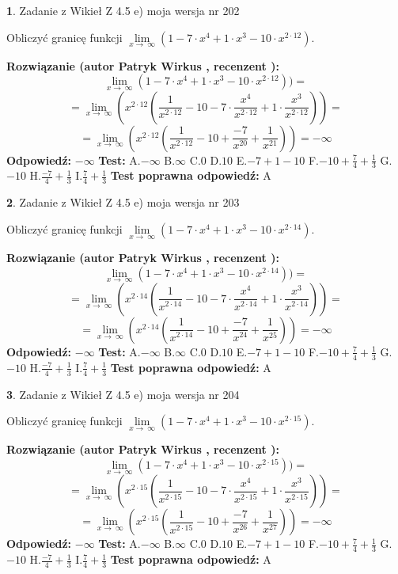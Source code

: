\documentclass[12pt, a4paper]{article}
\theoremstyle{definition} %
\newtheorem{zad}{}
\newcommand{\zadStart}[1]{\begin{zad}#1\newline}
\newcommand{\zadStop}{\end{zad}}
\newcommand{\rozwStart}[2]{\noindent \textbf{Rozwiązanie (autor #1 , recenzent #2): }\newline}
\newcommand{\rozwStop}{\newline}
\newcommand{\odpStart}{\noindent \textbf{Odpowiedź:}\newline}
\newcommand{\odpStop}{\newline}
\newcommand{\testStart}{\noindent \textbf{Test:}\newline}
\newcommand{\testStop}{\newline}
\newcommand{\kluczStart}{\noindent \textbf{Test poprawna odpowiedź:}\newline}
\newcommand{\kluczStop}{\newline}
\begin{document}
\zadStart{Zadanie z Wikieł Z 4.5 e) moja wersja nr 202}



Obliczyć granicę funkcji  $\lim\limits_{x\to\ \infty}(1 - 7 \cdot x^{4}+1 \cdot x^{3}- 10 \cdot x^{2\cdot12})$.
\zadStop
\rozwStart{Patryk Wirkus}{}
$$\lim\limits_{x\to\ \infty}(1 - 7 \cdot x^{4}+1 \cdot x^{3}- 10 \cdot x^{2\cdot12}))=$$
$$=\lim\limits_{x\to\ \infty}(x^{2\cdot12}(\frac{1}{x^{2\cdot12}}-10 -7 \cdot \frac{x^{4}}{x^{2\cdot12}}+1 \cdot \frac{x^{3}}{x^{2\cdot12}}))=$$
$$=\lim\limits_{x\to\ \infty}(x^{2\cdot12}(\frac{1}{x^{2\cdot12}}-10 + \frac{-7}{x^{20}}+ \frac{1}{x^{21}}))=-\infty$$
\rozwStop
\odpStart
$-\infty$
\odpStop
\testStart
A.$-\infty$ B.$\infty$ C.$0$ D.$10$ E.$-7 + 1 - 10$
F.$-10+\frac{7}{4}+\frac{1}{3}$ G.$-10$
H.$\frac{-7}{4}+\frac{1}{3}$
I.$\frac{7}{4}+\frac{1}{3}$
\testStop
\kluczStart
A
\kluczStop



\zadStart{Zadanie z Wikieł Z 4.5 e) moja wersja nr 203}



Obliczyć granicę funkcji  $\lim\limits_{x\to\ \infty}(1 - 7 \cdot x^{4}+1 \cdot x^{3}- 10 \cdot x^{2\cdot14})$.
\zadStop
\rozwStart{Patryk Wirkus}{}
$$\lim\limits_{x\to\ \infty}(1 - 7 \cdot x^{4}+1 \cdot x^{3}- 10 \cdot x^{2\cdot14}))=$$
$$=\lim\limits_{x\to\ \infty}(x^{2\cdot14}(\frac{1}{x^{2\cdot14}}-10 -7 \cdot \frac{x^{4}}{x^{2\cdot14}}+1 \cdot \frac{x^{3}}{x^{2\cdot14}}))=$$
$$=\lim\limits_{x\to\ \infty}(x^{2\cdot14}(\frac{1}{x^{2\cdot14}}-10 + \frac{-7}{x^{24}}+ \frac{1}{x^{25}}))=-\infty$$
\rozwStop
\odpStart
$-\infty$
\odpStop
\testStart
A.$-\infty$ B.$\infty$ C.$0$ D.$10$ E.$-7 + 1 - 10$
F.$-10+\frac{7}{4}+\frac{1}{3}$ G.$-10$
H.$\frac{-7}{4}+\frac{1}{3}$
I.$\frac{7}{4}+\frac{1}{3}$
\testStop
\kluczStart
A
\kluczStop



\zadStart{Zadanie z Wikieł Z 4.5 e) moja wersja nr 204}



Obliczyć granicę funkcji  $\lim\limits_{x\to\ \infty}(1 - 7 \cdot x^{4}+1 \cdot x^{3}- 10 \cdot x^{2\cdot15})$.
\zadStop
\rozwStart{Patryk Wirkus}{}
$$\lim\limits_{x\to\ \infty}(1 - 7 \cdot x^{4}+1 \cdot x^{3}- 10 \cdot x^{2\cdot15}))=$$
$$=\lim\limits_{x\to\ \infty}(x^{2\cdot15}(\frac{1}{x^{2\cdot15}}-10 -7 \cdot \frac{x^{4}}{x^{2\cdot15}}+1 \cdot \frac{x^{3}}{x^{2\cdot15}}))=$$
$$=\lim\limits_{x\to\ \infty}(x^{2\cdot15}(\frac{1}{x^{2\cdot15}}-10 + \frac{-7}{x^{26}}+ \frac{1}{x^{27}}))=-\infty$$
\rozwStop
\odpStart
$-\infty$
\odpStop
\testStart
A.$-\infty$ B.$\infty$ C.$0$ D.$10$ E.$-7 + 1 - 10$
F.$-10+\frac{7}{4}+\frac{1}{3}$ G.$-10$
H.$\frac{-7}{4}+\frac{1}{3}$
I.$\frac{7}{4}+\frac{1}{3}$
\testStop
\kluczStart
A
\kluczStop
\end{document}
